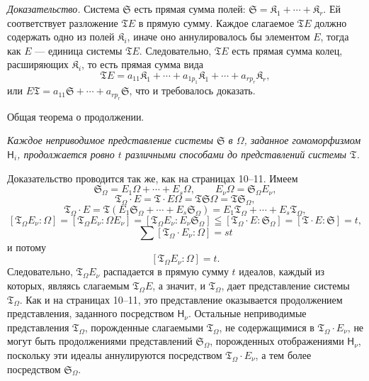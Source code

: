 \documentclass[11pt]{article}
\begin{document}
\emph{Доказательство.} Система \(\mathfrak S\) есть прямая сумма полей: \(\mathfrak S=\mathfrak K_1+\cdots+\mathfrak K_r\). Ей соответствует разложение \(\mathfrak T E\) в прямую сумму. Каждое слагаемое \(\mathfrak T E\) должно содержать одно из полей \(\mathfrak K_i\), иначе оно аннулировалось бы элементом \(E\), тогда как \(E\) --- единица системы \(\mathfrak T E\). Следовательно, \(\mathfrak T E\) есть прямая сумма колец, расширяющих \(\mathfrak K_i\), то есть прямая сумма вида
\[
\mathfrak T E=a_{11}\mathfrak K_1+\cdots+a_{1p_1}\mathfrak K_1+\cdots+a_{rp_r}\mathfrak K_r,
\]
или \(E\mathfrak T=a_{11}\mathfrak S+\cdots+a_{rp_r}\mathfrak S\), что и требовалось доказать.

\begin{center}
Общая теорема о продолжении.
\end{center}

\emph{Каждое неприводимое представление системы \(\mathfrak S\) в \(\Omega\), заданное гомоморфизмом \(\mathsf{H}_i\), продолжается ровно \(t\) различными способами до представлений системы \(\mathfrak T\).}

Доказательство проводится так же, как на страницах 10--11. Имеем
\[
\mathfrak S_\Omega=E_1\Omega+\cdots+E_s\Omega,\qquad
E_\nu\Omega=\mathfrak S_\Omega E_\nu,
\]
\[
\mathfrak T_\Omega\cdot E=\mathfrak T\cdot E\Omega
=\mathfrak T\mathfrak S\Omega=\mathfrak T\mathfrak S_\Omega,
\]
\[
\mathfrak T_\Omega\cdot E
=\mathfrak T(E_1\mathfrak S_\Omega+\cdots+E_s\mathfrak S_\Omega)
=E_1\mathfrak T_\Omega+\cdots+E_s\mathfrak T_\Omega,
\]
\[
[\mathfrak T_\Omega E_\nu:\Omega]
=[\mathfrak T_\Omega E_\nu:\Omega E_\nu]
=[\mathfrak T_\Omega E_\nu:E_\nu\mathfrak S_\Omega]
\leqq[\mathfrak T_\Omega\cdot E:\mathfrak S_\Omega]
=[\mathfrak T\cdot E:\mathfrak S]=t,
\]
\[
\sum[\mathfrak T_\Omega\cdot E_\nu:\Omega]=st
\]
и потому
\[
[\mathfrak T_\Omega E_\nu:\Omega]=t.
\]
Следовательно, \(\mathfrak T_\Omega E_\nu\) распадается в прямую сумму \(t\) идеалов, каждый из которых, являясь слагаемым \(\mathfrak T_\Omega E\), а значит, и \(\mathfrak T_\Omega\), дает представление системы \(\mathfrak T_\Omega\). Как и на страницах 10--11, это представление оказывается продолжением представления, заданного посредством \(\mathsf{H}_\nu\). Остальные неприводимые представления \(\mathfrak T_\Omega\), порожденные слагаемыми \(\mathfrak T_\Omega\), не содержащимися в \(\mathfrak T_\Omega\cdot E_\nu\), не могут быть продолжениями представлений \(\mathfrak S_\Omega\), порожденных отображениями \(\mathsf{H}_\nu\), поскольку эти идеалы аннулируются посредством \(\mathfrak T_\Omega\cdot E_\nu\), а тем более посредством \(\mathfrak S_\Omega\).
\end{document}
